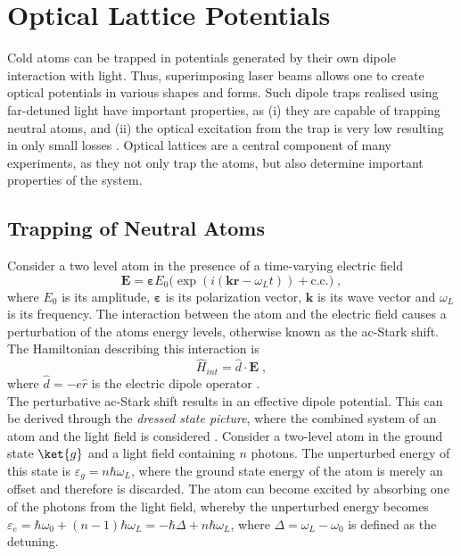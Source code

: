 \section{Optical Lattice Potentials}
Cold atoms can be trapped in potentials generated by their own dipole interaction with light. Thus, superimposing laser beams allows one to create optical potentials in various shapes and forms. Such dipole traps realised using far-detuned light have important properties, as (i) they are capable of trapping neutral atoms, and (ii) the optical excitation from the trap is very low resulting in only small losses \cite{grimm}. Optical lattices are a central component of many experiments, as they not only trap the atoms, but also determine important properties of the system.

\subsection{Trapping of Neutral Atoms}
Consider a two level atom in the presence of a time-varying electric field
\begin{equation}
	\boldsymbol{E} = \boldsymbol{\varepsilon} E_0 \big( \exp \left( i(\boldsymbol{k} \boldsymbol{r} - \omega_L t) \right) + \mathrm{c.c.} \big) \; ,
\end{equation}
where $E_0$ is its amplitude, $\boldsymbol{\varepsilon}$ is its polarization vector, $\boldsymbol{k}$ is its wave vector and $\omega_L$ is its frequency. The interaction between the atom and the electric field causes a perturbation of the atoms energy levels, otherwise known as the ac-Stark shift. The Hamiltonian describing this interaction is
\begin{equation}
	\hat{H}_{int} = \hat{d} \cdot \boldsymbol{E} \; , \label{eq:Hdipint}
\end{equation}
where $\hat{d} = -e \hat{r}$ is the electric dipole operator \cite{greiner}.\\
The perturbative ac-Stark shift results in an effective dipole potential. This can be derived through the \textit{dressed state picture}, where the combined system of an atom and the light field is considered \cite{cohen1992atom,cohen1998}. Consider a two-level atom in the ground state $\ket{g}$ and a light field containing $n$ photons. The unperturbed energy of this state is $\varepsilon_g = n \hbar \omega_L$, where the ground state energy of the atom is merely an offset and therefore is discarded. The atom can become excited by absorbing one of the photons from the light field, whereby the unperturbed energy becomes $\varepsilon_e = \hbar \omega_0 + (n-1) \hbar \omega_L = - \hbar \Delta + n \hbar \omega_L$, where $\Delta = \omega_L - \omega_0$ is defined as the detuning. 

